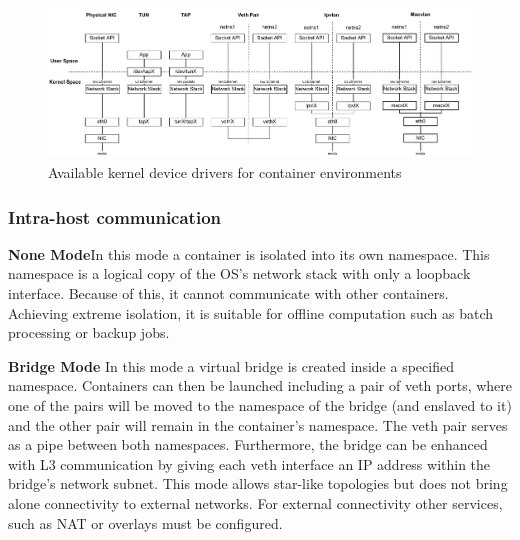 \documentclass[conference]{IEEEtran}
\begin{document}
\begin{figure}[!t]
\centering
\includegraphics[width=\textwidth]{container_network.drawio.pdf}
\caption{Available kernel device drivers for container environments}
\label{virtual_networks}
\end{figure}


\subsubsection{Intra-host communication}\hfill\break
\textbf{None Mode}\hspace{0.2cm}In this mode a container is isolated into its own namespace. This namespace is a logical copy of the OS’s network stack with only a loopback interface. Because of this, it cannot communicate with other containers. Achieving extreme isolation, it is suitable for offline computation such as batch processing or backup jobs.

\noindent\textbf{Bridge Mode}\hspace{0.2cm} In this mode a virtual bridge is created inside a specified namespace. Containers can then be launched including a pair of veth ports, where one of the pairs will be moved to the namespace of the bridge (and enslaved to it) and the other pair will remain in the container's namespace. The veth pair serves as a pipe between both namespaces. Furthermore, the bridge can be enhanced with L3 communication by giving each veth interface an IP address within the bridge's network subnet. This mode allows star-like topologies but does not bring alone connectivity to external networks. For external connectivity other services, such as NAT or overlays must be configured. 
\end{document}
